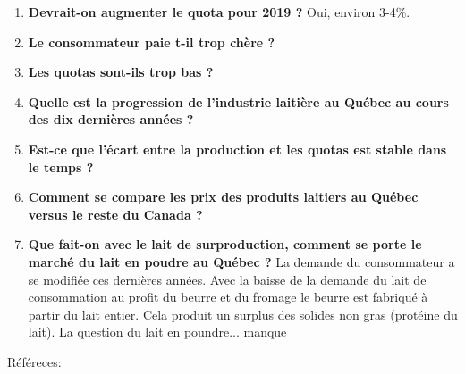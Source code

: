 \documentclass[11pt]{article}
\begin{document}
\begin{enumerate}
\def\labelenumi{\arabic{enumi}.}
\item
  \textbf{Devrait-on augmenter le quota pour 2019 ?} Oui, environ 3-4\%.
\item
  \textbf{Le consommateur paie t-il trop chère ?}
\item
  \textbf{Les quotas sont-ils trop bas ?}
\item
  \textbf{Quelle est la progression de l'industrie laitière au Québec au
  cours des dix dernières années ?}
\item
  \textbf{Est-ce que l'écart entre la production et les quotas est
  stable dans le temps ?}
\item
  \textbf{Comment se compare les prix des produits laitiers au Québec
  versus le reste du Canada ?}
\item
  \textbf{Que fait-on avec le lait de surproduction, comment se porte le
  marché du lait en poudre au Québec ?} La demande du consommateur a se
  modifiée ces dernières années. Avec la baisse de la demande du lait de
  consommation au profit du beurre et du fromage le beurre est fabriqué
  à partir du lait entier. Cela produit un surplus des solides non gras
  (protéine du lait). La question du lait en poundre... manque
\end{enumerate}

    Référeces:
\end{document}
